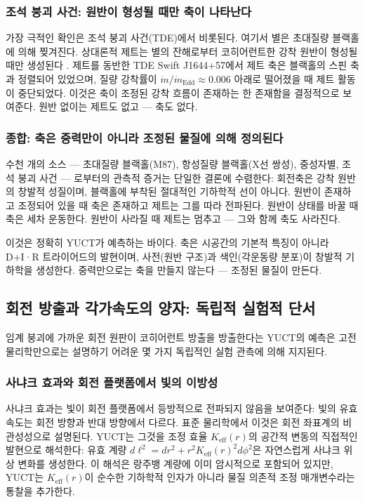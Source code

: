 \documentclass[12pt,a4paper]{article}
\begin{document}
	\subsubsection{조석 붕괴 사건: 원반이 형성될 때만 축이 나타난다}
	
	가장 극적인 확인은 조석 붕괴 사건(TDE)에서 비롯된다. 여기서 별은 초대질량 블랙홀에 의해 찢겨진다. 상대론적 제트는 별의 잔해로부터 코히어런트한 강착 원반이 형성될 때만 생성된다 \cite{TDE2016,TDE2020}. 제트를 동반한 TDE Swift J1644+57에서 제트 축은 블랙홀의 스핀 축과 정렬되어 있었으며, 질량 강착률이 \(\dot{m}/\dot{m}_{\text{Edd}} \approx 0.006\) 아래로 떨어졌을 때 제트 활동이 중단되었다. 이것은 축이 조정된 강착 흐름이 존재하는 한 존재함을 결정적으로 보여준다. 원반 없이는 제트도 없고 — 축도 없다.
	
	\subsubsection{종합: 축은 중력만이 아니라 조정된 물질에 의해 정의된다}
	
	수천 개의 소스 — 초대질량 블랙홀(M87), 항성질량 블랙홀(X선 쌍성), 중성자별, 조석 붕괴 사건 — 로부터의 관측적 증거는 단일한 결론에 수렴한다: 회전축은 강착 원반의 창발적 성질이며, 블랙홀에 부착된 절대적인 기하학적 선이 아니다. 원반이 존재하고 조정되어 있을 때 축은 존재하고 제트는 그를 따라 전파된다. 원반이 상태를 바꿀 때 축은 세차 운동한다. 원반이 사라질 때 제트는 멈추고 — 그와 함께 축도 사라진다.
	
	이것은 정확히 YUCT가 예측하는 바이다. 축은 시공간의 기본적 특징이 아니라 D+I·R 트라이어드의 발현이며, 사전(원반 구조)과 색인(각운동량 분포)이 창발적 기하학을 생성한다. 중력만으로는 축을 만들지 않는다 — 조정된 물질이 만든다.
	
	\subsection{회전 방출과 각가속도의 양자: 독립적 실험적 단서}
	
	임계 붕괴에 가까운 회전 원판이 코히어런트 방출을 방출한다는 YUCT의 예측은 고전 물리학만으로는 설명하기 어려운 몇 가지 독립적인 실험 관측에 의해 지지된다.
	
	\subsubsection{사냐크 효과와 회전 플랫폼에서 빛의 이방성}
	
	사냐크 효과는 빛이 회전 플랫폼에서 등방적으로 전파되지 않음을 보여준다: 빛의 유효 속도는 회전 방향과 반대 방향에서 다르다. 표준 물리학에서 이것은 회전 좌표계의 비관성성으로 설명된다. YUCT는 그것을 조정 효율 \(K_{\mathrm{eff}}(r)\)의 공간적 변동의 직접적인 발현으로 해석한다: 유효 계량 \(d\ell^2 = dr^2 + r^2 K_{\mathrm{eff}}(r)^2 d\phi^2\)은 자연스럽게 사냐크 위상 변화를 생성한다. 이 해석은 랑주뱅 계량에 이미 암시적으로 포함되어 있지만, YUCT는 \(K_{\mathrm{eff}}(r)\)이 순수한 기하학적 인자가 아니라 물질 의존적 조정 매개변수라는 통찰을 추가한다.
	
\end{document}
